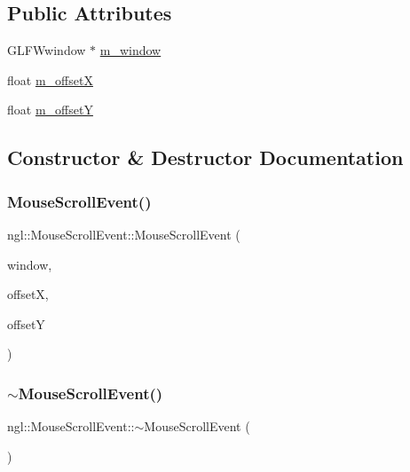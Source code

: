 \subsection*{Public Attributes}
\begin{DoxyCompactItemize}
\item 
G\+L\+F\+Wwindow $\ast$ \mbox{\hyperlink{structngl_1_1_mouse_scroll_event_a003ee76e6d0f5e574aa61e90c4b295e3}{m\+\_\+window}}
\item 
float \mbox{\hyperlink{structngl_1_1_mouse_scroll_event_a1e3c92caddd0257976b540247b597c02}{m\+\_\+offsetX}}
\item 
float \mbox{\hyperlink{structngl_1_1_mouse_scroll_event_ad8d15e16b6f89f61184b53fdbc876968}{m\+\_\+offsetY}}
\end{DoxyCompactItemize}


\subsection{Constructor \& Destructor Documentation}
\mbox{\label{structngl_1_1_mouse_scroll_event_a746ace21fdf81b759738e16c7990ab06}} 
\subsubsection{\texorpdfstring{Mouse\+Scroll\+Event()}{MouseScrollEvent()}}
{\footnotesize\ttfamily ngl\+::\+Mouse\+Scroll\+Event\+::\+Mouse\+Scroll\+Event (\begin{DoxyParamCaption}\item[{G\+L\+F\+Wwindow $\ast$}]{window,  }\item[{const float}]{offsetX,  }\item[{const float}]{offsetY }\end{DoxyParamCaption})}

\mbox{\label{structngl_1_1_mouse_scroll_event_aa3891161095d29b520f1fb3c3ae015c3}} 
\subsubsection{\texorpdfstring{$\sim$\+Mouse\+Scroll\+Event()}{~MouseScrollEvent()}}
{\footnotesize\ttfamily ngl\+::\+Mouse\+Scroll\+Event\+::$\sim$\+Mouse\+Scroll\+Event (\begin{DoxyParamCaption}{ }\end{DoxyParamCaption})}



